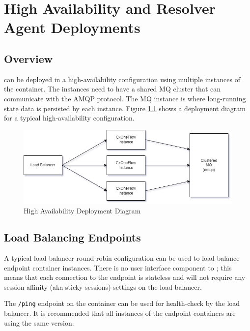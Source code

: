 \chapter{High Availability and Resolver Agent Deployments}
\label{sec:high-availability}

\section{Overview}

\cxoneflow can be deployed in a high-availability configuration using multiple instances of
the \cxoneflow container.  The \cxoneflow instances need to have a shared MQ cluster that
can communicate with the AMQP protocol.  The MQ instance is where long-running state data
is persisted by each instance.  Figure \ref{fig:ha-diagram} shows a deployment diagram for
a typical high-availability configuration.


\begin{figure}[h]
    \includegraphics[width=\textwidth]{graphics/cxoneflow-diagrams-HA.png}
    \caption{High Availability Deployment Diagram}
    \label{fig:ha-diagram}
\end{figure}


\section{Load Balancing \cxoneflow Endpoints}

A typical load balancer round-robin configuration can be used to load balance \cxoneflow endpoint container instances.
There is no user interface component to \cxoneflow; this means that each connection to the \cxoneflow endpoint is stateless
and will not require any session-affinity (aka sticky-sessions) settings on the load balancer.

The \texttt{/ping} endpoint on the \cxoneflow container can be used for health-check by the load balancer.  
It is recommended that all instances of the \cxoneflow endpoint containers are using the same version.

